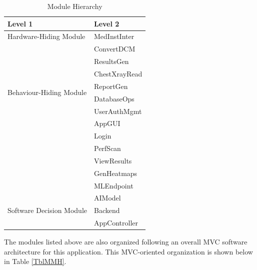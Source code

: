 \documentclass[12pt, titlepage]{article}
\begin{document}
\begin{table}[H]
  \centering
  \begin{tabular}{p{} p{}}
    \toprule
    \textbf{Level 1} & \textbf{Level 2} \\
    \midrule

    {Hardware-Hiding Module} & MedInstInter \\
    \midrule

    \multirow{8}{0.3\textwidth}{Behaviour-Hiding Module} & ConvertDCM \\
    & ResultsGen \\
    & ChestXrayRead \\
    & ReportGen \\
    & DatabaseOps \\
    & UserAuthMgmt \\
    & AppGUI \\
    & Login \\ 
    & PerfScan \\
    & ViewResults \\
    & GenHeatmaps  \\
    & MLEndpoint  \\
    \midrule

    \multirow{4}{0.3\textwidth}{Software Decision Module} & AIModel \\
    & Backend \\
    & AppController \\
    \bottomrule

  \end{tabular}
  \caption{Module Hierarchy}
  \label{TblMH}
\end{table}

The modules listed above are also organized following an overall MVC software
architecture for this application. This MVC-oriented organization is shown
below in Table \ref{TblMMH}.
\end{document}

